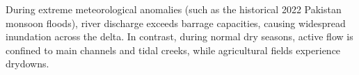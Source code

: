 During extreme meteorological anomalies (such as the historical 2022 Pakistan monsoon floods), river discharge exceeds barrage capacities, causing widespread inundation across the delta. In contrast, during normal dry seasons, active flow is confined to main channels and tidal creeks, while agricultural fields experience drydowns.
